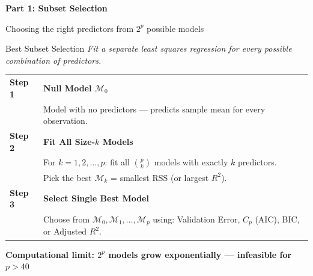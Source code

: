 \documentclass[ignorenonframetext,]{beamer}
\begin{document}
\begin{frame}
\centering
{\Large{}\textbf{Part 1: Subset Selection}}

\vspace{12pt}
Choosing the right predictors from $2^p$ possible models
\end{frame}

\begin{frame}{Best Subset Selection}
\emph{Fit a separate least squares regression for every possible combination of predictors.}

\small
\begin{tabular}{@{}p{}p{}@{}}
\toprule
\textbf{Step 1} & \textbf{Null Model $\mathcal{M}_0$}\\
& Model with no predictors --- predicts sample mean for every observation.\\
\midrule
\textbf{Step 2} & \textbf{Fit All Size-$k$ Models}\\
& For $k = 1, 2, \ldots, p$: fit all $\binom{p}{k}$ models with exactly $k$ predictors.\\
& Pick the best $\mathcal{M}_k$ = smallest RSS (or largest $R^2$).\\
\midrule
\textbf{Step 3} & \textbf{Select Single Best Model}\\
& Choose from $\mathcal{M}_0, \mathcal{M}_1, \ldots, \mathcal{M}_p$ using: Validation Error, $C_p$ (AIC), BIC, or Adjusted $R^2$.\\
\bottomrule
\end{tabular}

\vspace{6pt}
\begin{alertblock}{}
\small\textbf{Computational limit: $2^p$ models grow exponentially --- infeasible for $p > 40$}
\end{alertblock}
\end{frame}
\end{document}
